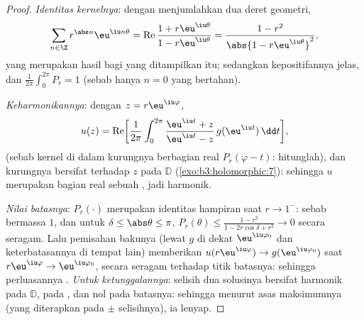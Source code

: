 \begin{proof}
\emph{Identitas kernelnya}: dengan menjumlahkan dua deret geometri,
\[
\sum_{n\in\Z}r^{\abs n}\eu^{\iu n\theta}
= \operatorname{Re}\frac{1 + r\eu^{\iu\theta}}{1 -
r\eu^{\iu\theta}}
= \frac{1 - r^2}{\abs{1 - r\eu^{\iu\theta}}^2},
\]
yang merupakan hasil bagi yang ditampilkan itu; sedangkan kepositifannya jelas, dan
$\frac1{2\pi}\int_0^{2\pi}P_r = 1$ (sebab hanya $n = 0$ yang bertahan).

\emph{Keharmonikannya}: dengan $z = r\eu^{\iu\varphi}$,
\[
u(z) = \operatorname{Re}\biggl[\frac1{2\pi}\int_0^{2\pi}
\frac{\eu^{\iu t} + z}{\eu^{\iu t} - z}\,
g(\eu^{\iu t})\,\dd t\biggr],
\]
(sebab kernel di dalam kurungnya berbagian real $P_r(\varphi - t)$:
hitunglah), dan kurungnya bersifat  terhadap $z$ pada $\mathbb D$
(\cref{exo:b3:holomorphic:7}): sehingga $u$ merupakan bagian real sebuah
, jadi harmonik.

\emph{Nilai batasnya}: $P_r(\cdot)$ merupakan identitas
hampiran saat $r \to 1^-$: sebab bermassa $1$, dan untuk $\delta \leq
\abs\theta \leq \pi$, $P_r(\theta) \leq \frac{1 - r^2}{1 -
2r\cos\delta + r^2} \to 0$ secara seragam. Lalu pemisahan bakunya
(lewat  $g$ di dekat $\eu^{\iu\varphi_0}$ dan keterbatasannya
di tempat lain) memberikan $u(r\eu^{\iu\varphi}) \to
g(\eu^{\iu\varphi_0})$ saat $r\eu^{\iu\varphi} \to
\eu^{\iu\varphi_0}$, secara seragam terhadap titik batasnya: sehingga
perluasannya . \emph{Untuk ketunggalannya}: selisih
dua solusinya bersifat harmonik pada $\mathbb D$,  pada
, dan nol pada batasnya: sehingga menurut asas maksimumnya
(yang diterapkan pada $\pm$ selisihnya), ia lenyap.
\end{proof}

